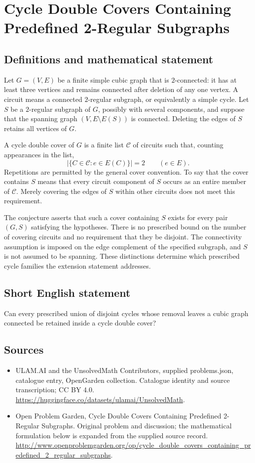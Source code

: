 \documentclass[11pt,a4paper]{article}
\begin{document}
\section*{Cycle Double Covers Containing Predefined 2-Regular Subgraphs}\label{statement}

\subsection{Definitions and mathematical statement}
Let $G=(V,E)$ be a finite simple cubic graph that is $2$-connected:
it has at least three vertices and remains connected after deletion
of any one vertex. A circuit means a connected $2$-regular subgraph,
or equivalently a simple cycle. Let $S$ be a $2$-regular subgraph
of $G$, possibly with several components, and suppose that the
spanning graph $(V,E\setminus E(S))$ is connected. Deleting the edges
of $S$ retains all vertices of $G$.

A cycle double cover of $G$ is a finite list $\mathcal C$ of circuits
such that, counting appearances in the list,
\[
 \bigl|\{C\in\mathcal C:e\in E(C)\}\bigr|=2
 \qquad(e\in E).
\]
Repetitions are permitted by the general cover convention. To say
that the cover contains $S$ means that every circuit component of
$S$ occurs as an entire member of $\mathcal C$. Merely covering the
edges of $S$ within other circuits does not meet this requirement.

The conjecture asserts that such a cover containing $S$ exists for
every pair $(G,S)$ satisfying the hypotheses. There is no prescribed
bound on the number of covering circuits and no requirement that
they be disjoint. The connectivity assumption is imposed on the
edge complement of the specified subgraph, and $S$ is not assumed
to be spanning. These distinctions determine which prescribed
cycle families the extension statement addresses.
\subsection{Short English statement}
Can every prescribed union of disjoint cycles whose removal leaves a cubic graph connected be retained inside a cycle double cover?
\subsection{Sources}
\begin{itemize}
\item[S1] ULAM.AI and the UnsolvedMath Contributors, supplied problems.json, catalogue entry, OpenGarden collection. Catalogue identity and source transcription; CC BY 4.0.
\url{https://huggingface.co/datasets/ulamai/UnsolvedMath}.
\item[S2] Open Problem Garden, Cycle Double Covers Containing Predefined 2-Regular Subgraphs. Original problem and discussion; the mathematical formulation below is expanded from the supplied source record.
\url{http://www.openproblemgarden.org/op/cycle_double_covers_containing_predefined_2_regular_subgraphs}.
\end{itemize}
\end{document}
